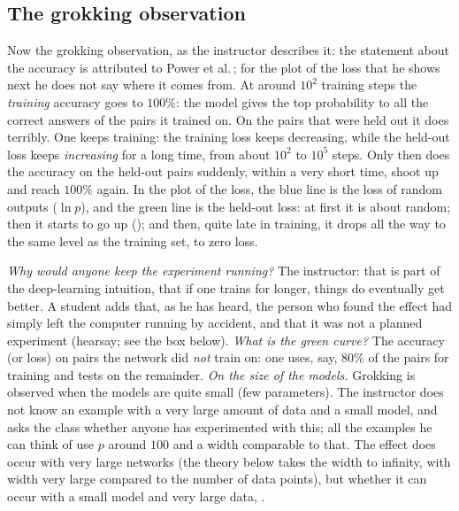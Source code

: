 \subsection{The grokking observation}\label{sec:L5-grok-obs}
Now the grokking observation, as the instructor describes it: the statement about the accuracy is attributed to Power et al.\,\citep{power2022}; for the plot of the loss that he shows next he does not say where it comes from. At around $10^2$ training steps the \emph{training} accuracy goes to $100\%$: the model gives the top probability to all the correct answers of the pairs it trained on. On the pairs that were held out it does terribly. One keeps training: the training loss keeps decreasing, while the held-out loss keeps \emph{increasing} for a long time, from about $10^2$ to $10^5$ steps. Only then does the accuracy on the held-out pairs suddenly, within a very short time, shoot up and reach $100\%$ again. In the plot of the loss, the blue line is the loss of random outputs ($\ln p$), and the green line is the held-out loss: at first it is about random; then it starts to go up (); and then, quite late in training, it drops all the way to the same level as the training set, to zero loss.

\begin{discussion}
\emph{Why would anyone keep the experiment running?} The instructor: that is part of the deep-learning intuition, that if one trains for longer, things do eventually get better. A student adds that, as he has heard, the person who found the effect had simply left the computer running by accident, and that it was not a planned experiment (hearsay; see the box below).
\emph{What is the green curve?} The accuracy (or loss) on pairs the network did \emph{not} train on: one uses, say, $80\%$ of the pairs for training and tests on the remainder.
\emph{On the size of the models.} Grokking is observed when the models are quite small (few parameters). The instructor does not know an example with a very large amount of data and a small model, and asks the class whether anyone has experimented with this; all the examples he can think of use $p$ around $100$ and a width comparable to that. The effect does occur with very large networks (the theory below takes the width to infinity, with width very large compared to the number of data points), but whether it can occur with a small model and very large data, .
\end{discussion}

